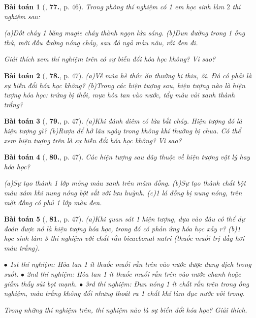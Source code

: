 \documentclass{article}
\numberwithin{equation}{section}
\newtheorem{baitoan}{Bài toán}
\begin{document}
\begin{baitoan}[\cite{An_400_BT_Hoa_Hoc_8_2020}, \textbf{77.}, p. 46]
	Trong phòng thí nghiệm có 1 em học sinh làm $2$ thí nghiệm sau:
	
		(a)Đốt cháy 1 băng magie cháy thành ngọn lửa sáng.
		(b)Đun đường trong 1 ống thử, mới đầu đường nóng chảy, sau đó ngả màu nâu, rồi đen đi.
	
	Giải thích xem thí nghiệm trên có sự biến đổi hóa học không? Vì sao?
\end{baitoan}

\begin{baitoan}[\cite{An_400_BT_Hoa_Hoc_8_2020}, \textbf{78.}, p. 47]
	
		(a)Về mùa hè thức ăn thường bị thiu, ôi. Đó có phải là sự biến đổi hóa học không?
		(b)Trong các hiện tượng sau, hiện tượng nào là hiện tượng hóa học: trứng bị thối, mực hòa tan vào nước, tẩy màu vải xanh thành trắng?
	
\end{baitoan}

\begin{baitoan}[\cite{An_400_BT_Hoa_Hoc_8_2020}, \textbf{79.}, p. 47]

	(a)Khi đánh diêm có lửa bắt cháy. Hiện tượng đó là hiện tượng gì?
	(b)Rượu để hở lâu ngày trong không khí thường bị chua. Có thể xem hiện tượng trên là sự biến đổi hóa học không? Vì sao?
	
\end{baitoan}

\begin{baitoan}[\cite{An_400_BT_Hoa_Hoc_8_2020}, \textbf{80.}, p. 47]
	Các hiện tượng sau đây thuộc về hiện tượng vật lý hay hóa học?
	
		(a)Sự tạo thành 1 lớp mỏng màu xanh trên mâm đồng.
		(b)Sự tạo thành chất bột màu xám khi nung nóng bột sắt với lưu huỳnh.
		(c)1 lá đồng bị nung nóng, trên mặt đồng có phủ 1 lớp màu đen.
	
\end{baitoan}

\begin{baitoan}[\cite{An_400_BT_Hoa_Hoc_8_2020}, \textbf{81.}, p. 47]
	
		(a)Khi quan sát 1 hiện tượng, dựa vào đâu có thể dự đoán được nó là hiện tượng hóa học, trong đó có phản ứng hóa học xảy r?
		(b)1 học sinh làm 3 thí nghiệm với chất rắn bicacbonat natri \emph{} (thuốc muối trị đầy hơi màu trắng).
		
			$\bullet$ 1st thí nghiệm: Hòa tan 1 ít thuốc muối rắn trên vào nước được dung dịch trong suốt.
			$\bullet$ 2nd thí nghiệm: Hòa tan 1 ít thuốc muối rắn trên vào nước chanh hoặc giấm thấy sủi bọt mạnh.
			$\bullet$ 3rd thí nghiệm: Đun nóng 1 ít chất rắn trên trong ống nghiệm, màu trắng không đổi nhưng thoát ra 1 chất khí làm đục nước vôi trong.
		
		Trong những thí nghiệm trên, thí nghiệm nào là sự biến đổi hóa học? Giải thích.
	
\end{baitoan}
\end{document}
